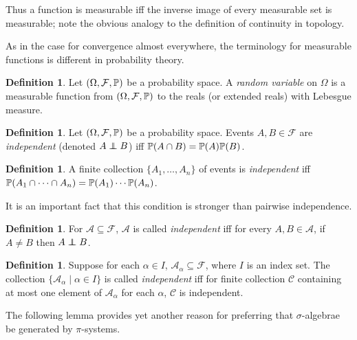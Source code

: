 \documentclass{amsart}
\theoremstyle{definition}
\newtheorem{definition}[theorem]{Definition}
\theoremstyle{remark}
\newcommand{\bldset}[2]{\{{#1}\mid{#2}\}}
\newcommand\indep{\protect\mathpalette{\protect\independenT}{\perp}}
\def\independenT#1#2{\mathrel{\rlap{$#1#2$}\mkern2mu{#1#2}}}
\begin{document}
Thus a function is measurable iff the inverse image of every measurable set is measurable; note the obvious analogy to the definition of continuity in topology.

As in the case for convergence almost everywhere, the terminology for measurable functions is different in probability theory.

\begin{definition}
Let $(\Omega, \mathcal F, \P)$ be a probability space. A {\em random variable} on $\Omega$ is a measurable function from $(\Omega, \mathcal F, \P)$ to the reals (or extended reals) with Lebesgue measure.
\end{definition}


\begin{definition}
Let $(\Omega, \mathcal F, \P)$ be a probability space. Events $A, B \in \mathcal F$ are {\em independent} (denoted $A \indep B$) iff $\P(A \cap B) = \P(A)\P(B)$.
\end{definition}

\begin{definition}
A finite collection $\{A_1, \ldots, A_n\}$ of events is {\em independent} iff $\P(A_1 \cap \cdots \cap A_n) = \P(A_1) \cdots \P(A_n)$.
\end{definition}

It is an important fact that this condition is stronger than pairwise independence.


\begin{definition}
For $\mathcal A \subseteq \mathcal F$, $\mathcal A$ is called {\em independent} iff for every $A, B \in \mathcal A$, if $A \ne B$ then $A \indep B$.
\end{definition}

\begin{definition}
Suppose for each $\alpha \in I$, $\mathcal A_\alpha \subseteq \mathcal F$, where $I$ is an index set. The collection $\bldset{\mathcal A_\alpha}{\alpha \in I}$ is called {\em independent} iff for finite collection $\mathcal C$ containing at most one element of $\mathcal A_\alpha$ for each $\alpha$, $\mathcal C$ is independent.
\end{definition}

The following lemma provides yet another reason for preferring that $\sigma$-algebrae be generated by $\pi$-systems.
\end{document}

